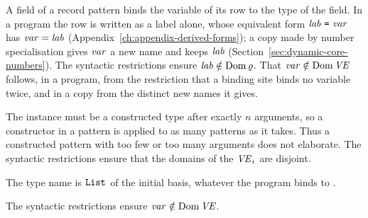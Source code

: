 

\begin{rulecomments}
 A field of a record pattern binds the variable of its
row to the type of the field. In a program the row is written as a label
alone, whose equivalent form $\mathit{lab}\ \textnormal{\texttt{=}}\ \mathit{var}$ has $\mathit{var} = \mathit{lab}$
(Appendix~\ref{ch:appendix-derived-forms}); a copy made by number
specialisation gives $\mathit{var}$ a new name and keeps $\mathit{lab}$
(Section~\ref{sec:dynamic-core-numbers}). %
The syntactic restrictions ensure $\mathit{lab} \notin \mathrm{Dom}\,\varrho$. That
$\mathit{var} \notin \mathrm{Dom}\,\mathit{VE}$ follows, in a program, from the restriction that a
binding site binds no variable twice, and in a copy from the distinct new
names it gives.
\end{rulecomments}






\begin{rulecomments}
 The instance must be a constructed type after exactly $n$
arguments, so a constructor in a pattern is applied to as many patterns as it
takes. Thus a constructed pattern with too few or too many arguments does not
elaborate. The syntactic restrictions ensure that the domains of the $\mathit{VE}_i$
are disjoint. %

 The type name is $\mathtt{List}$ of the initial basis, whatever
the program binds to .

 The syntactic restrictions ensure $\mathit{var} \notin \mathrm{Dom}\,\mathit{VE}$.
\end{rulecomments}

